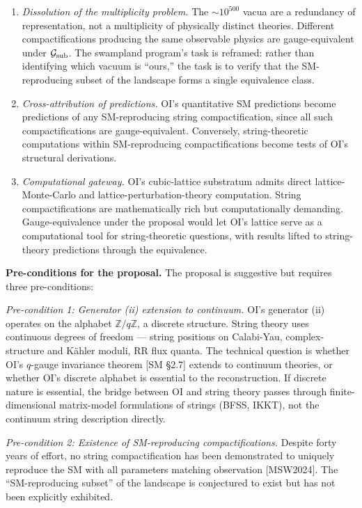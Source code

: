 \documentclass[
]{article}
\begin{document}
\begin{enumerate}
\def\labelenumi{(\Alph{enumi})}
\item
  \emph{Dissolution of the multiplicity problem.} The \(\sim 10^{500}\)
  vacua are a redundancy of representation, not a multiplicity of
  physically distinct theories. Different compactifications producing
  the same observable physics are gauge-equivalent under
  \(\mathcal{G}_{\rm sub}\). The swampland program's task is reframed:
  rather than identifying which vacuum is ``ours,'' the task is to
  verify that the SM-reproducing subset of the landscape forms a single
  equivalence class.
\item
  \emph{Cross-attribution of predictions.} OI's quantitative SM
  predictions become predictions of any SM-reproducing string
  compactification, since all such compactifications are
  gauge-equivalent. Conversely, string-theoretic computations within
  SM-reproducing compactifications become tests of OI's structural
  derivations.
\item
  \emph{Computational gateway.} OI's cubic-lattice substratum admits
  direct lattice-Monte-Carlo and lattice-perturbation-theory
  computation. String compactifications are mathematically rich but
  computationally demanding. Gauge-equivalence under the proposal would
  let OI's lattice serve as a computational tool for string-theoretic
  questions, with results lifted to string-theory predictions through
  the equivalence.
\end{enumerate}

\textbf{Pre-conditions for the proposal.} The proposal is suggestive but
requires three pre-conditions:

\emph{Pre-condition 1: Generator (ii) extension to continuum.} OI's
generator (ii) operates on the alphabet \(\mathbb{Z}/q\mathbb{Z}\), a
discrete structure. String theory uses continuous degrees of freedom ---
string positions on Calabi-Yau, complex-structure and Kähler moduli, RR
flux quanta. The technical question is whether OI's \(q\)-gauge
invariance theorem {[}SM §2.7{]} extends to continuum theories, or
whether OI's discrete alphabet is essential to the reconstruction. If
discrete nature is essential, the bridge between OI and string theory
passes through finite-dimensional matrix-model formulations of strings
(BFSS, IKKT), not the continuum string description directly.

\emph{Pre-condition 2: Existence of SM-reproducing compactifications.}
Despite forty years of effort, no string compactification has been
demonstrated to uniquely reproduce the SM with all parameters matching
observation {[}MSW2024{]}. The ``SM-reproducing subset'' of the
landscape is conjectured to exist but has not been explicitly exhibited.
\end{document}
